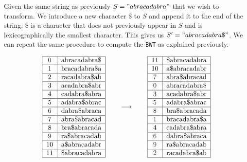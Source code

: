 \documentclass{article}
\begin{document}
Given the same string as previously \(S="abracadabra"\) that we wish to transform. We introduce a new character \(\$\) to \(S\) and append it to the end of the string. \(\$\) is a character that does not previously appear in \(S\) and is lexicographically the smallest character. This gives us \(S' = "abracadabra\$"\). We can repeat the same procedure to compute the \texttt{BWT} as explained previously.
\begin{figure}[H]
    \[
        \begin{tabular}{|c|c|}
            \hline
            0 & abracadabra\$ \\ \hline
            1 & bracadabra\$a \\ \hline
            2 & racadabra\$ab \\ \hline
            3 & acadabra\$abr \\ \hline
            4 & cadabra\$abra \\ \hline
            5 & adabra\$abrac \\ \hline
            6 & dabra\$abraca \\ \hline
            7 & abra\$abracad \\ \hline
            8 & bra\$abracada \\ \hline
            9 & ra\$abracadab \\ \hline
            10 & a\$abracadabr \\ \hline
            11 & \$abracadabra \\ \hline
        \end{tabular}
        \qquad \longrightarrow \qquad
        \begin{tabular}{|c|c|}
            \hline
            11 & \$abracadabra \\ \hline
            10 & a\$abracadabr \\ \hline
            7 & abra\$abracad \\ \hline
            0 & abracadabra\$ \\ \hline
            3 & acadabra\$abr \\ \hline
            5 & adabra\$abrac \\ \hline
            8 & bra\$abracada \\ \hline
            1 & bracadabra\$a \\ \hline
            4 & cadabra\$abra \\ \hline
            6 & dabra\$abraca \\ \hline
            9 & ra\$abracadab \\ \hline
            2 & racadabra\$ab \\ \hline
        \end{tabular}
    \]
\end{figure}
\end{document}
